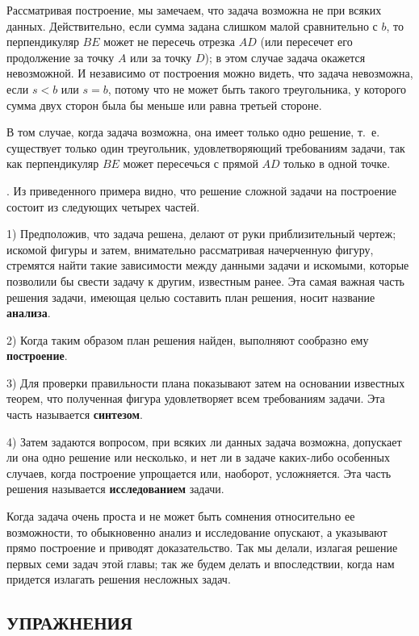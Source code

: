 \documentclass[oneside]{book}
\begin{document}
Рассматривая построение, мы замечаем, что задача возможна не при всяких данных.
Действительно, если сумма задана слишком малой сравнительно с $b$, то перпендикуляр $BE$ может не пересечь отрезка $AD$ (или пересечет его продолжение за точку $A$ или за точку $D$);
в этом случае задача окажется невозможной.
И независимо от построения можно видеть, что задача невозможна, если $s<b$ или $s=b$, потому что не может быть такого треугольника, у которого сумма двух сторон была бы меньше или равна третьей стороне.

В том случае, когда задача возможна, она имеет только одно решение, т.~е. существует только один треугольник, удовлетворяющий требованиям задачи, так как перпендикуляр $BE$ может пересечься с прямой $AD$ только в одной точке.

.
Из приведенного примера видно, что решение сложной задачи на построение состоит из следующих четырех частей.

1) Предположив, что задача решена, делают от руки приблизительный чертеж;
искомой фигуры и затем, внимательно рассматривая начерченную фигуру, стремятся найти такие зависимости между данными задачи и искомыми, которые позволили бы свести задачу к другим, известным ранее.
Эта самая важная часть решения задачи, имеющая целью составить план решения, носит название \textbf{анализа}.

2) Когда таким образом план решения найден, выполняют сообразно ему \textbf{построение}.

3) Для проверки правильности плана показывают затем на основании известных теорем, что полученная фигура удовлетворяет всем требованиям задачи.
Эта часть называется \textbf{синтезом}.

4) Затем задаются вопросом, при всяких ли данных задача возможна, допускает ли она одно решение или несколько, и нет ли в задаче каких-либо особенных случаев, когда построение упрощается или, наоборот, усложняется.
Эта часть решения называется \textbf{исследованием} задачи.

Когда задача очень проста и не может быть сомнения относительно ее возможности, то обыкновенно анализ и исследование опускают, а указывают прямо построение и приводят доказательство.
Так мы делали, излагая решение первых семи задач этой главы;
так же будем делать и впоследствии, когда нам придется излагать решения несложных задач.

\subsection*{УПРАЖНЕНИЯ}
\end{document}
